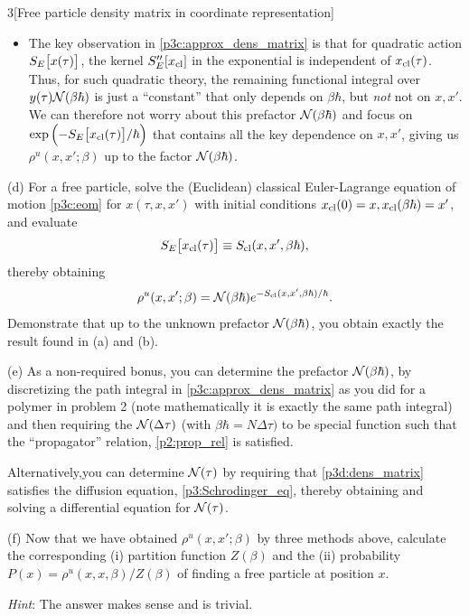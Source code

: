 \documentclass[12pt]{article}
\begin{document}
\begin{problem}{3}[Free particle density matrix in coordinate representation]
\begin{itemize}
    \item The key observation in \cref{p3c:approx_dens_matrix} is that for
        quadratic action $S_E\qty[x(\tau)]$, the kernel $S_E''\qty[x_{\text{cl}}]$
        in the exponential is independent of $x_{\text{cl}}(\tau)$. Thus, for such
        quadratic theory, the remaining functional integral over
        $y(\tau)\mathcal{N}(\beta\hbar)$ is just a ``constant'' that only depends on
        $\beta\hbar$, but \textit{not} not on $x,x'$. We can therefore not worry
        about this prefactor $\mathcal{N}(\beta\hbar)$ and focus on
        $\exp\qty(-S_E\qty[x_{\text{cl}}(\tau)]/\hbar)$ that contains all the key
        dependence on $x,x'$, giving us $\rho^u(x,x';\beta)$ up to the factor
        $\mathcal{N}(\beta\hbar)$.
\end{itemize}

\begin{solution}
    
\end{solution}

(d) For a free particle, solve the (Euclidean) classical Euler-Lagrange equation
of motion \cref{p3c:eom} for $x(\tau,x,x')$ with initial conditions
$x_{\text{cl}}(0)=x,x_{\text{cl}}(\beta\hbar)=x'$, and evaluate
\begin{equation}
    S_E\qty[x_{\text{cl}}(\tau)]\equiv S_{\text{cl}}(x,x',\beta\hbar), 
\end{equation}
thereby obtaining
\begin{equation}\label{p3d:dens_matrix}
    \rho^u(x,x';\beta)=\mathcal{N}(\beta\hbar)e^{-S_{\text{cl}}(x,x',\beta\hbar)/\hbar}. 
\end{equation}
Demonstrate that up to the unknown prefactor $\mathcal{N}(\beta\hbar)$, you obtain
exactly the result found in (a) and (b).
\begin{solution}
    
\end{solution}

(e) As a non-required bonus, you can determine the prefactor $\mathcal{N}(\beta\hbar)$,
by discretizing the path integral in \eqref{p3c:approx_dens_matrix} as you did
for a polymer in problem 2 (note mathematically it is exactly the same path
integral) and then requiring the $\mathcal{N}(\Delta\tau)$ (with
$\beta\hbar=N\Delta\tau)$ to be special function such that the ``propagator''
relation, \eqref{p2:prop_rel} is satisfied.

Alternatively,you can determine $\mathcal{N}(\tau)$ by requiring that
\eqref{p3d:dens_matrix} satisfies the diffusion equation,
\eqref{p3:Schrodinger_eq}, thereby obtaining and solving a differential equation
for $\mathcal{N}(\tau)$.
\begin{solution}
    
\end{solution}

(f) Now that we have obtained $\rho^u(x,x';\beta)$ by three methods above,
calculate the corresponding (i) partition function $Z(\beta)$ and the (ii)
probability $P(x)=\rho^u(x,x,\beta)/Z(\beta)$ of finding a free particle at
position $x$.

\textit{Hint}: The answer makes sense and is trivial.

\end{problem}
\end{document}
